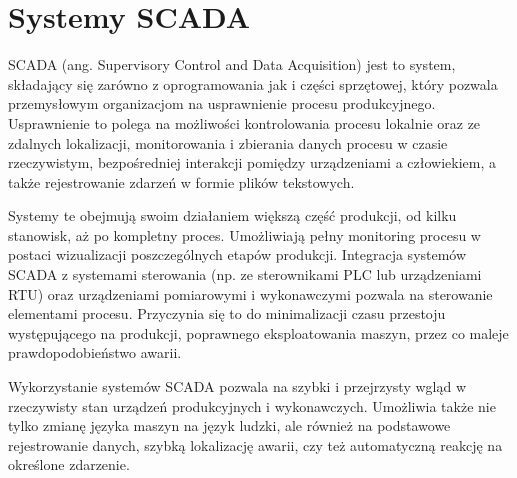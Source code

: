 


\section{Systemy SCADA}
\label{sec:SCADA}

SCADA (ang. Supervisory Control and Data Acquisition) jest to system, składający się zarówno z oprogramowania jak i części sprzętowej, który pozwala przemysłowym organizacjom na usprawnienie procesu produkcyjnego. Usprawnienie to polega na możliwości kontrolowania procesu lokalnie oraz ze zdalnych lokalizacji, monitorowania i zbierania danych procesu w czasie rzeczywistym, bezpośredniej interakcji pomiędzy urządzeniami a człowiekiem, a także rejestrowanie zdarzeń w formie plików tekstowych.

Systemy te obejmują swoim działaniem większą część produkcji, od kilku stanowisk, aż po kompletny proces. Umożliwiają pełny monitoring procesu w postaci wizualizacji poszczególnych etapów produkcji. Integracja systemów SCADA z systemami sterowania (np. ze sterownikami PLC lub urządzeniami RTU) oraz urządzeniami pomiarowymi i wykonawczymi pozwala na sterowanie elementami procesu. Przyczynia się to do minimalizacji czasu przestoju występującego na produkcji, poprawnego eksploatowania maszyn, przez co maleje prawdopodobieństwo awarii.


Wykorzystanie systemów SCADA pozwala na szybki i przejrzysty wgląd w rzeczywisty stan urządzeń produkcyjnych i wykonawczych. Umożliwia także nie tylko zmianę języka maszyn na język ludzki, ale również na podstawowe rejestrowanie danych, szybką lokalizację awarii, czy też automatyczną reakcję na określone zdarzenie. 

